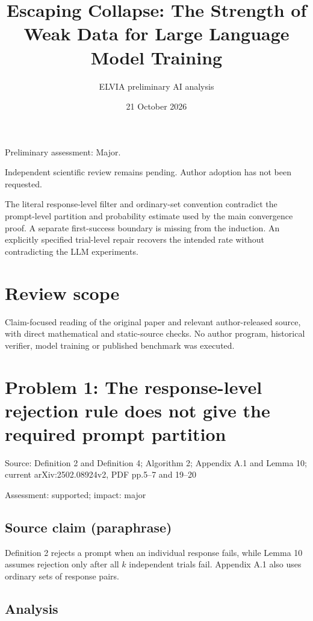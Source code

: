 \documentclass[11pt]{article}
\begin{document}
\title{Escaping Collapse: The Strength of Weak Data for Large Language Model Training}

\author{ELVIA preliminary AI analysis}\date{21 October 2026}\maketitle

Preliminary assessment: Major.\par

Independent scientific review remains pending. Author adoption has not been requested.

The literal response-level filter and ordinary-set convention contradict the prompt-level partition and probability estimate used by the main convergence proof. A separate first-success boundary is missing from the induction. An explicitly specified trial-level repair recovers the intended rate without contradicting the LLM experiments.

\section*{Review scope}

Claim-focused reading of the original paper and relevant author-released source, with direct mathematical and static-source checks. No author program, historical verifier, model training or published benchmark was executed.

\section*{Problem 1: The response-level rejection rule does not give the required prompt partition}

Source: Definition 2 and Definition 4; Algorithm 2; Appendix A.1 and Lemma 10; current arXiv:2502.08924v2, PDF pp.5–7 and 19–20

Assessment: supported; impact: major

\subsection*{Source claim (paraphrase)}

Definition 2 rejects a prompt when an individual response fails, while Lemma 10 assumes rejection only after all \(k\) independent trials fail. Appendix A.1 also uses ordinary sets of response pairs.

\subsection*{Analysis}
\end{document}
